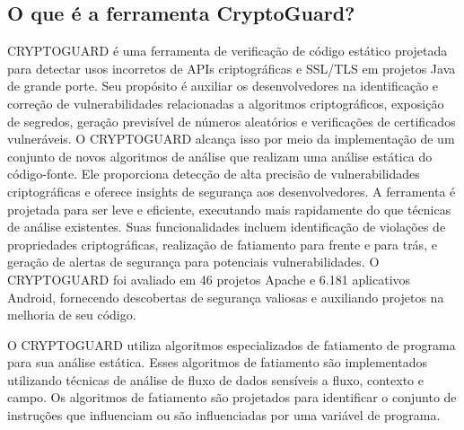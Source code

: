 \subsection{O que é a ferramenta CryptoGuard?}

CRYPTOGUARD é uma ferramenta de verificação de código estático projetada para detectar usos incorretos de APIs criptográficas e SSL/TLS em projetos Java de grande porte. \cite{CryptoGuard} Seu propósito é auxiliar os desenvolvedores na identificação e correção de vulnerabilidades relacionadas a algoritmos criptográficos, exposição de segredos, geração previsível de números aleatórios e verificações de certificados vulneráveis. \cite{CryptoGuard} O CRYPTOGUARD alcança isso por meio da implementação de um conjunto de novos algoritmos de análise que realizam uma análise estática do código-fonte. \cite{CryptoGuard} Ele proporciona detecção de alta precisão de vulnerabilidades criptográficas e oferece insights de segurança aos desenvolvedores. \cite{CryptoGuard} A ferramenta é projetada para ser leve e eficiente, executando mais rapidamente do que técnicas de análise existentes. \cite{CryptoGuard} Suas funcionalidades incluem identificação de violações de propriedades criptográficas, realização de fatiamento para frente e para trás, e geração de alertas de segurança para potenciais vulnerabilidades. \cite{CryptoGuard} O CRYPTOGUARD foi avaliado em 46 projetos Apache e 6.181 aplicativos Android, fornecendo descobertas de segurança valiosas e auxiliando projetos na melhoria de seu código.  \cite{CryptoGuard}



O CRYPTOGUARD utiliza algoritmos especializados de fatiamento de programa para sua análise estática. Esses algoritmos de fatiamento são implementados utilizando técnicas de análise de fluxo de dados sensíveis a fluxo, contexto e campo. Os algoritmos de fatiamento são projetados para identificar o conjunto de instruções que influenciam ou são influenciadas por uma variável de programa. \cite{CryptoGuard}

